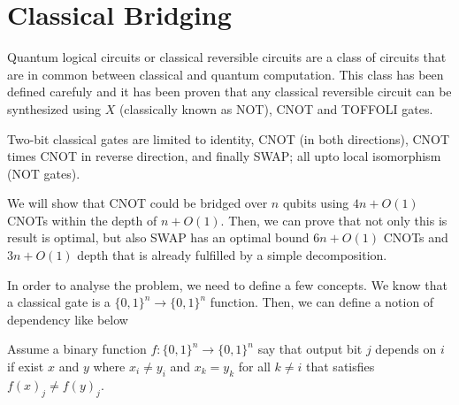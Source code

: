 
\section{Classical Bridging}\label{sec:classical_bridging}

Quantum logical circuits or classical reversible circuits are a class of circuits that are in common between classical and quantum computation. This class has been defined carefuly \cite{shende2003} and it has been proven that any classical reversible circuit can be synthesized using $X$ (classically known as NOT), CNOT and TOFFOLI gates.

Two-bit classical gates are limited to identity, CNOT (in both directions), CNOT times CNOT in reverse direction, and finally SWAP; all upto local isomorphism (NOT gates).

We will show that CNOT could be bridged over $n$ qubits using $4n + O(1)$ CNOTs within the depth of $n + O(1)$. Then, we can prove that not only this is result is optimal, but also SWAP has an optimal bound $6n + O(1)$ CNOTs and $3n + O(1)$ depth that is already fulfilled by a simple decomposition.

In order to analyse the problem, we need to define a few concepts. We know that a classical gate is a $\{0, 1\}^n \to \{0, 1\}^n$ function. Then, we can define a notion of dependency like below

\begin{definition}
  Assume a binary function $f: \{0, 1\}^n \to \{0, 1\}^n$ say that output bit $j$ depends on $i$ if exist $x$ and $y$ where $x_i \neq y_i$ and $x_k = y_k$ for all $k \ne i$ that satisfies $f(x)_j \neq f(y)_j$.
\end{definition}




